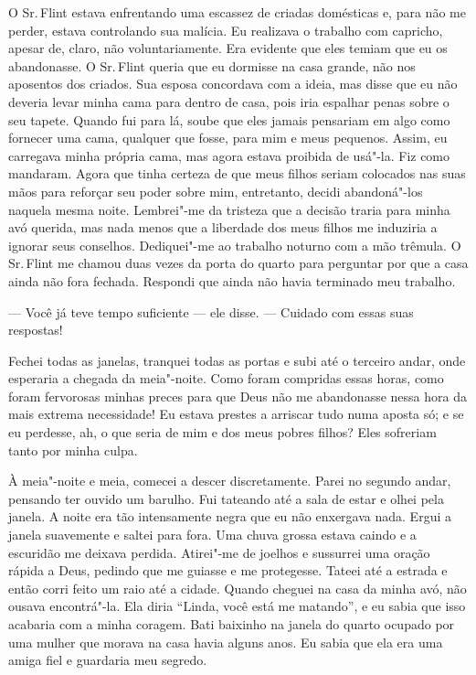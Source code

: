 O Sr.\,Flint estava enfrentando uma
escassez de criadas domésticas e, para não me perder, estava controlando
sua malícia. Eu realizava o trabalho com capricho, apesar de, claro, não
voluntariamente. Era evidente que eles temiam que eu os abandonasse. O
Sr.\,Flint queria que eu dormisse na casa grande, não nos aposentos dos
criados. Sua esposa concordava com a ideia, mas disse que eu não deveria
levar minha cama para dentro de casa, pois iria espalhar penas sobre o
seu tapete. Quando fui para lá, soube que eles jamais pensariam em algo
como fornecer uma cama, qualquer que fosse, para mim e meus pequenos.
Assim, eu carregava minha própria cama, mas agora estava proibida de
usá"-la. Fiz como mandaram. Agora que tinha certeza de que meus filhos
seriam colocados nas suas mãos para reforçar seu poder sobre mim,
entretanto, decidi abandoná"-los naquela mesma noite. Lembrei"-me da
tristeza que a decisão traria para minha avó querida, mas nada menos que
a liberdade dos meus filhos me induziria a ignorar seus conselhos.
Dediquei"-me ao trabalho noturno com a mão trêmula. O Sr.\,Flint me chamou
duas vezes da porta do quarto para perguntar por que a casa ainda não
fora fechada. Respondi que ainda não havia terminado meu trabalho.

--- Você já teve tempo suficiente --- ele disse. --- Cuidado com essas
suas respostas!

Fechei todas as janelas, tranquei todas
as portas e subi até o terceiro andar, onde esperaria a chegada da
meia"-noite. Como foram compridas essas horas, como foram fervorosas
minhas preces para que Deus não me abandonasse nessa hora da mais
extrema necessidade! Eu estava prestes a arriscar tudo numa aposta só; e
se eu perdesse, ah, o que seria de mim e dos meus pobres filhos? Eles
sofreriam tanto por minha culpa.

À meia"-noite e meia, comecei a descer
discretamente. Parei no segundo andar, pensando ter ouvido um barulho.
Fui tateando até a sala de estar e olhei pela janela. A noite era tão
intensamente negra que eu não enxergava nada. Ergui a janela suavemente
e saltei para fora. Uma chuva grossa estava caindo e a escuridão me
deixava perdida. Atirei"-me de joelhos e sussurrei uma oração rápida a
Deus, pedindo que me guiasse e me protegesse. Tateei até a estrada e
então corri feito um raio até a cidade. Quando cheguei na casa da minha
avó, não ousava encontrá"-la. Ela diria ``Linda, você está me matando'',
e eu sabia que isso acabaria com a minha coragem. Bati baixinho na
janela do quarto ocupado por uma mulher que morava na casa havia alguns
anos. Eu sabia que ela era uma amiga fiel e guardaria meu segredo.

